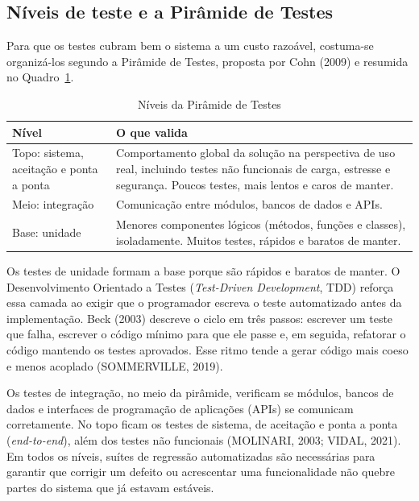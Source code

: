 \documentclass[12pt,a4paper]{article}
\newcommand{\fonte}[1]{\vspace{0.2cm}{\small Fonte: #1}}
\begin{document}
\subsection{Níveis de teste e a Pirâmide de Testes}

Para que os testes cubram bem o sistema a um custo razoável, costuma-se organizá-los segundo a Pirâmide de Testes, proposta por Cohn (2009) e resumida no Quadro~\ref{quadro:piramide}.

\begin{table}[htbp]
\centering
\caption{Níveis da Pirâmide de Testes}
\label{quadro:piramide}
\begin{tabularx}{\textwidth}{>{\raggedright\arraybackslash}p{3.6cm} X}
\toprule
\textbf{Nível} & \textbf{O que valida} \\
\midrule
Topo: sistema, aceitação e ponta a ponta & Comportamento global da solução na perspectiva de uso real, incluindo testes não funcionais de carga, estresse e segurança. Poucos testes, mais lentos e caros de manter. \\
\addlinespace
Meio: integração & Comunicação entre módulos, bancos de dados e APIs. \\
\addlinespace
Base: unidade & Menores componentes lógicos (métodos, funções e classes), isoladamente. Muitos testes, rápidos e baratos de manter. \\
\bottomrule
\end{tabularx}

\fonte{elaborado pelo autor com base em Cohn (2009), Molinari (2003), Sommerville (2019) e Vidal (2021).}
\end{table}

Os testes de unidade formam a base porque são rápidos e baratos de manter. O Desenvolvimento Orientado a Testes (\textit{Test-Driven Development}, TDD) reforça essa camada ao exigir que o programador escreva o teste automatizado antes da implementação. Beck (2003) descreve o ciclo em três passos: escrever um teste que falha, escrever o código mínimo para que ele passe e, em seguida, refatorar o código mantendo os testes aprovados. Esse ritmo tende a gerar código mais coeso e menos acoplado (SOMMERVILLE, 2019).

Os testes de integração, no meio da pirâmide, verificam se módulos, bancos de dados e interfaces de programação de aplicações (APIs) se comunicam corretamente. No topo ficam os testes de sistema, de aceitação e ponta a ponta (\textit{end-to-end}), além dos testes não funcionais (MOLINARI, 2003; VIDAL, 2021). Em todos os níveis, suítes de regressão automatizadas são necessárias para garantir que corrigir um defeito ou acrescentar uma funcionalidade não quebre partes do sistema que já estavam estáveis.
\end{document}
